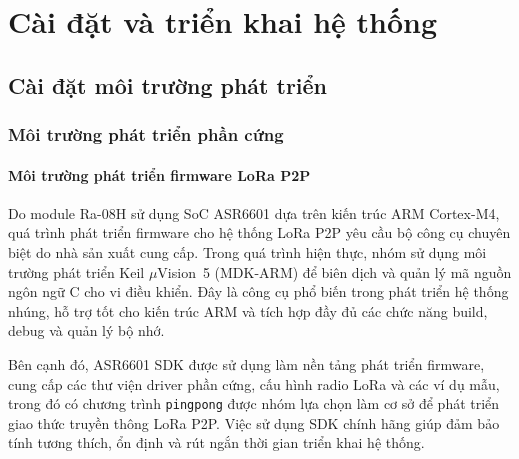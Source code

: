 \chapter{Cài đặt và triển khai hệ thống}

\section{Cài đặt môi trường phát triển}

\subsection{Môi trường phát triển phần cứng}

\subsubsection{Môi trường phát triển firmware LoRa P2P}
Do module Ra-08H sử dụng SoC ASR6601 dựa trên kiến trúc ARM Cortex-M4, quá trình phát
triển firmware cho hệ thống LoRa P2P yêu cầu bộ công cụ chuyên biệt do nhà sản xuất
cung cấp. Trong quá trình hiện thực, nhóm sử dụng môi trường phát triển Keil
$\mu$Vision~5 (MDK-ARM) để biên dịch và quản lý mã nguồn ngôn ngữ C cho vi điều khiển.
Đây là công cụ phổ biến trong phát triển hệ thống nhúng, hỗ trợ tốt cho kiến trúc
ARM và tích hợp đầy đủ các chức năng build, debug và quản lý bộ nhớ.

Bên cạnh đó, ASR6601 SDK được sử dụng làm nền tảng phát triển firmware, cung cấp
các thư viện driver phần cứng, cấu hình radio LoRa và các ví dụ mẫu, trong đó có
chương trình \texttt{pingpong} được nhóm lựa chọn làm cơ sở để phát triển giao thức
truyền thông LoRa P2P. Việc sử dụng SDK chính hãng giúp đảm bảo tính tương thích,
ổn định và rút ngắn thời gian triển khai hệ thống.


